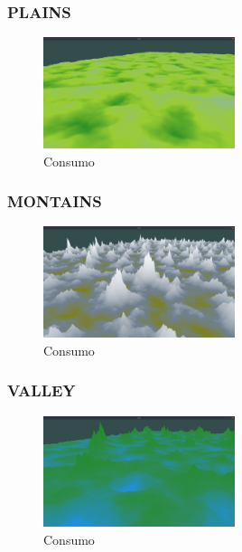 \subsubsection{PLAINS}

\begin{figure}[H]
    \centering
    \includegraphics[width=0.5\textwidth]{figuras/bssPlains.png}
    \caption{Consumo}
    \label{fig:bssPlains}
\end{figure}

\subsubsection{MONTAINS}


\begin{figure}[H]
    \centering
    \includegraphics[width=0.5\textwidth]{figuras/bssMontains.png}
    \caption{Consumo}
    \label{fig:bssMontains}
\end{figure}

\subsubsection{VALLEY}


\begin{figure}[H]
    \centering
    \includegraphics[width=0.5\textwidth]{figuras/bssValley.png}
    \caption{Consumo}
    \label{fig:bssValley}
\end{figure}

